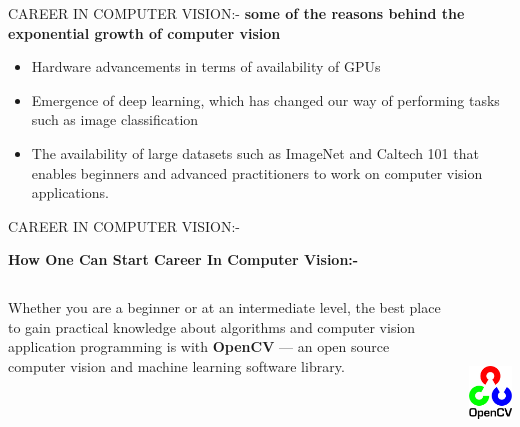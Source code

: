 \documentclass{beamer}
\begin{document}
\begin{frame}{CAREER IN COMPUTER VISION:-}
\textbf{some of the reasons behind the exponential growth of computer vision}
\begin{itemize}
\item Hardware advancements in terms of availability of GPUs
\item Emergence of deep learning, which has changed our way of performing tasks such as image classification
\item The availability of large datasets such as ImageNet and Caltech 101 that enables beginners and advanced practitioners to work on computer vision applications.
\end{itemize}

\end{frame}

\begin{frame}{CAREER IN COMPUTER VISION:-}

\textbf{How One Can Start Career In Computer Vision:-}

\begin{columns}[t]
\begin{column}{5cm}
Whether you are a beginner or at an intermediate level, the best place to gain practical knowledge about algorithms and computer vision application programming is with \textbf{OpenCV} — an open source computer vision and machine learning software library.
\end{column}
\begin{column}[t]{5cm}
\includegraphics[height=5cm]{OpenCV.jpg}
\end{column}
\end{columns}
\end{frame}
\end{document}
